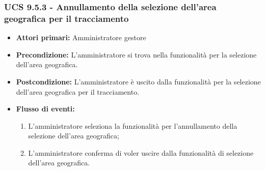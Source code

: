 \subsubsection{UCS 9.5.3 - Annullamento della selezione dell'area geografica per il tracciamento}%
\begin{itemize}
\item \textbf{Attori primari:} Amministratore gestore
\item \textbf{Precondizione:} L'amministratore si trova nella funzionalità per la selezione dell'area geografica.
\item \textbf{Postcondizione:} L'amministratore è uscito dalla funzionalità per la selezione dell'area geografica per il tracciamento.
\item \textbf{Flusso di eventi:}
    \begin{enumerate}
    \item L'amministratore seleziona la funzionalità per l'annullamento della selezione dell'area geografica;
    \item L'amministratore conferma di voler uscire dalla funzionalità di selezione dell'area geografica.
    \end{enumerate} 
\end{itemize}